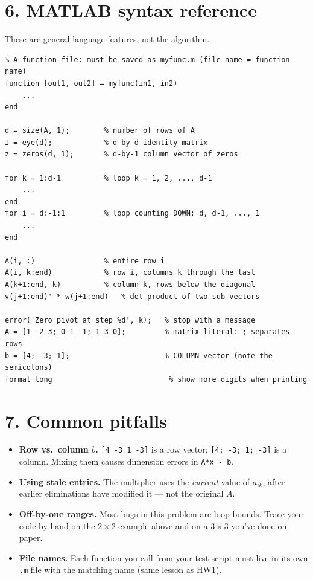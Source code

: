 \documentclass[11pt]{article}
\begin{document}
\section*{6. MATLAB syntax reference}

These are general language features, not the algorithm.

\begin{lstlisting}
% A function file: must be saved as myfunc.m (file name = function name)
function [out1, out2] = myfunc(in1, in2)
    ...
end

d = size(A, 1);        % number of rows of A
I = eye(d);            % d-by-d identity matrix
z = zeros(d, 1);       % d-by-1 column vector of zeros

for k = 1:d-1          % loop k = 1, 2, ..., d-1
    ...
end
for i = d:-1:1         % loop counting DOWN: d, d-1, ..., 1
    ...
end

A(i, :)                % entire row i
A(i, k:end)            % row i, columns k through the last
A(k+1:end, k)          % column k, rows below the diagonal
v(j+1:end)' * w(j+1:end)   % dot product of two sub-vectors

error('Zero pivot at step %d', k);   % stop with a message
A = [1 -2 3; 0 1 -1; 1 3 0];         % matrix literal: ; separates rows
b = [4; -3; 1];                      % COLUMN vector (note the semicolons)
format long                           % show more digits when printing
\end{lstlisting}

\section*{7. Common pitfalls}

\begin{itemize}
  \item \textbf{Row vs.\ column $b$.} \texttt{[4 -3 1 -3]} is a row
        vector; \texttt{[4; -3; 1; -3]} is a column. Mixing them causes
        dimension errors in \texttt{A*x - b}.
  \item \textbf{Using stale entries.} The multiplier uses the
        \emph{current} value of $a_{ik}$, after earlier eliminations have
        modified it --- not the original $A$.
  \item \textbf{Off-by-one ranges.} Most bugs in this problem are loop
        bounds. Trace your code by hand on the $2\times 2$ example above
        and on a $3\times 3$ you've done on paper.
  \item \textbf{File names.} Each function you call from your test
        script must live in its own \texttt{.m} file with the matching
        name (same lesson as HW1).
\end{itemize}
\end{document}

